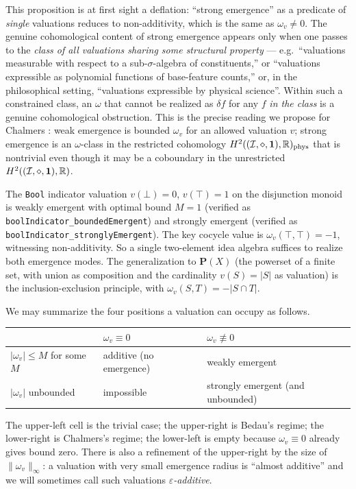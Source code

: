This proposition is at first sight a deflation: ``strong emergence'' as a
predicate of \emph{single} valuations reduces to non-additivity, which is
the same as $\omega_v \neq 0$. The genuine cohomological content of strong
emergence appears only when one passes to the \emph{class of all valuations
sharing some structural property} --- e.g.\ ``valuations measurable with
respect to a sub-$\sigma$-algebra of constituents,'' or ``valuations
expressible as polynomial functions of base-feature counts,'' or, in the
philosophical setting, ``valuations expressible by physical
science''. Within such a constrained class, an $\omega$ that cannot be
realized as $\delta f$ for any $f$ \emph{in the class} is a genuine
cohomological obstruction. This is the precise reading we propose for
Chalmers \cite{ChalmersStrong}: weak emergence is bounded $\omega_v$ for an
allowed valuation $v$; strong emergence is an $\omega$-class in the
restricted cohomology $H^2((\mathcal{I},\mathbin{\diamond},\mathbf{1}), \mathbb{R})_{\mathrm{phys}}$ that is
nontrivial even though it may be a coboundary in the unrestricted
$H^2((\mathcal{I},\mathbin{\diamond},\mathbf{1}), \mathbb{R})$.

\begin{example}\label{ex:bool-strong}
The \texttt{Bool} indicator valuation $v(\bot) = 0$, $v(\top) = 1$ on the
disjunction monoid is weakly emergent with optimal bound $M = 1$ (verified
as \texttt{boolIndicator\_boundedEmergent}) and strongly emergent (verified
as \texttt{boolIndicator\_stronglyEmergent}). The key cocycle value is
$\omega_v(\top, \top) = -1$, witnessing non-additivity. So a single
two-element idea algebra suffices to realize both emergence modes. The
generalization to $\mathbf{P}(X)$ (the powerset of a finite set, with
union as composition and the cardinality $v(S) = |S|$ as valuation) is the
inclusion-exclusion principle, with $\omega_v(S, T) = -|S\cap T|$.
\end{example}

\begin{remark}
We may summarize the four positions a valuation can occupy as follows.
\begin{center}
\begin{tabular}{lll}\toprule
& $\omega_v \equiv 0$ & $\omega_v \not\equiv 0$\\\midrule
$|\omega_v| \le M$ for some $M$ & additive (no emergence) & weakly emergent\\
$|\omega_v|$ unbounded & impossible & strongly emergent (and unbounded)\\
\bottomrule
\end{tabular}
\end{center}
The upper-left cell is the trivial case; the upper-right is Bedau's regime;
the lower-right is Chalmers's regime; the lower-left is empty because
$\omega_v \equiv 0$ already gives bound zero. There is also a refinement of
the upper-right by the size of $\|\omega_v\|_\infty$: a valuation with very
small emergence radius is ``almost additive'' and we will sometimes call
such valuations \emph{$\varepsilon$-additive}.
\end{remark}

